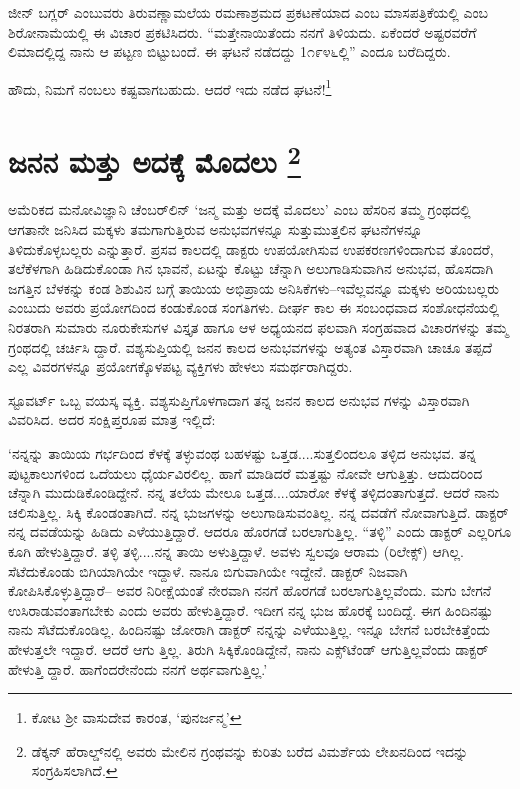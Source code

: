 ಜೀನ್ ಬಗ್ಲರ್ ಎಂಬುವರು ತಿರುವಣ್ಣಾಮಲೆಯ ರಮಣಾಶ್ರಮದ ಪ್ರಕಟಣೆಯಾದ ಎಂಬ ಮಾಸಪತ್ರಿಕೆಯಲ್ಲಿ  ಎಂಬ ಶಿರೋನಾಮೆಯಲ್ಲಿ ಈ ವಿಚಾರ ಪ್ರಕಟಿಸಿದರು. “ಮತ್ತೇನಾಯಿತೆಂದು ನನಗೆ ತಿಳಿಯದು. ಏಕೆಂದರೆ ಅಷ್ಟರವರೆಗೆ ಲಿಮಾದಲ್ಲಿದ್ದ ನಾನು ಆ ಪಟ್ಟಣ ಬಿಟ್ಟುಬಂದೆ. ಈ ಘಟನೆ ನಡೆದದ್ದು 1೧೯೪೬ಲ್ಲಿ” ಎಂದೂ ಬರೆದಿದ್ದರು.

ಹೌದು, ನಿಮಗೆ ನಂಬಲು ಕಷ್ಟವಾಗಬಹುದು. ಆದರೆ ಇದು ನಡೆದ ಘಟನೆ!\footnote{ ಕೋಟ ಶ‍್ರೀ ವಾಸುದೇವ ಕಾರಂತ, ‘ಪುನರ್ಜನ್ಮ’}


\section{ಜನನ ಮತ್ತು ಅದಕ್ಕೆ ಮೊದಲು \protect\footnote{ ಡೆಕ್ಕನ್ ಹೆರಾಲ್ಡ್​ನಲ್ಲಿ  ಅವರು ಮೇಲಿನ ಗ್ರಂಥವನ್ನು ಕುರಿತು ಬರೆದ ವಿಮರ್ಶೆಯ ಲೇಖನದಿಂದ ಇದನ್ನು ಸಂಗ್ರಹಿಸಲಾಗಿದೆ.}}

ಅಮೆರಿಕದ ಮನೋವಿಜ್ಞಾನಿ ಚೆಂಬರ್​ಲಿನ್ ‘ಜನ್ಮ ಮತ್ತು ಅದಕ್ಕೆ ಮೊದಲು’ ಎಂಬ ಹೆಸರಿನ ತಮ್ಮ ಗ್ರಂಥದಲ್ಲಿ ಆಗತಾನೇ ಜನಿಸಿದ ಮಕ್ಕಳು ತಮಗಾಗುತ್ತಿರುವ ಅನುಭವಗಳನ್ನೂ ಸುತ್ತುಮುತ್ತಲಿನ ಘಟನೆಗಳನ್ನೂ ತಿಳಿದುಕೊಳ್ಳಬಲ್ಲರು ಎನ್ನುತ್ತಾರೆ. ಪ್ರಸವ ಕಾಲದಲ್ಲಿ ಡಾಕ್ಟರು ಉಪಯೋಗಿಸುವ ಉಪಕರಣಗಳಿಂದಾಗುವ ತೊಂದರೆ, ತಲೆಕೆಳಗಾಗಿ ಹಿಡಿದುಕೊಂಡಾ ಗಿನ ಭಾವನೆ, ಏಟನ್ನು ಕೊಟ್ಟು ಚೆನ್ನಾಗಿ ಅಲುಗಾಡಿಸುವಾಗಿನ ಅನುಭವ, ಹೊಸದಾಗಿ ಜಗತ್ತಿನ ಬೆಳಕನ್ನು ಕಂಡ ಶಿಶುವಿನ ಬಗ್ಗೆ ತಾಯಿಯ ಅಭಿಪ್ರಾಯ ಅನಿಸಿಕೆಗಳು–ಇವೆಲ್ಲವನ್ನೂ ಮಕ್ಕಳು ಅರಿಯಬಲ್ಲರು ಎಂಬುದು ಅವರು ಪ್ರಯೋಗದಿಂದ ಕಂಡುಕೊಂಡ ಸಂಗತಿಗಳು. ದೀರ್ಘ ಕಾಲ ಈ ಸಂಬಂಧವಾದ ಸಂಶೋಧನೆಯಲ್ಲಿ ನಿರತರಾಗಿ ಸುಮಾರು ನೂರುಕೇಸುಗಳ ವಿಸ್ತೃತ ಹಾಗೂ ಆಳ ಅಧ್ಯಯನದ ಫಲವಾಗಿ ಸಂಗ್ರಹವಾದ ವಿಚಾರಗಳನ್ನು ತಮ್ಮ ಗ್ರಂಥದಲ್ಲಿ ಚರ್ಚಿಸಿ ದ್ದಾರೆ. ವಶ್ಯಸುಪ್ತಿಯಲ್ಲಿ ಜನನ ಕಾಲದ ಅನುಭವಗಳನ್ನು ಅತ್ಯಂತ ವಿಸ್ತಾರವಾಗಿ ಚಾಚೂ ತಪ್ಪದೆ ಎಲ್ಲ ವಿವರಗಳನ್ನೂ ಪ್ರಯೋಗಕ್ಕೊಳಪಟ್ಟ ವ್ಯಕ್ತಿಗಳು ಹೇಳಲು ಸಮರ್ಥರಾಗಿದ್ದರು.

ಸ್ಟೂವರ್ಟ್ ಒಬ್ಬ ವಯಸ್ಕ ವ್ಯಕ್ತಿ. ವಶ್ಯಸುಪ್ತಿಗೊಳಗಾದಾಗ ತನ್ನ ಜನನ ಕಾಲದ ಅನುಭವ ಗಳನ್ನು ವಿಸ್ತಾರವಾಗಿ ವಿವರಿಸಿದ. ಅದರ ಸಂಕ್ಷಿಪ್ತರೂಪ ಮಾತ್ರ ಇಲ್ಲಿದೆ:

‘ನನ್ನನ್ನು ತಾಯಿಯ ಗರ್ಭದಿಂದ ಕೆಳಕ್ಕೆ ತಳ್ಳುವಂಥ ಬಹಳಷ್ಟು ಒತ್ತಡ....ಸುತ್ತಲಿಂದಲೂ ತಳ್ಳಿದ ಅನುಭವ. ತನ್ನ ಪುಟ್ಟಕಾಲುಗಳಿಂದ ಒದೆಯಲು ಧೈರ್ಯವಿರಲಿಲ್ಲ. ಹಾಗೆ ಮಾಡಿದರೆ ಮತ್ತಷ್ಟು ನೋವೇ ಆಗುತ್ತಿತ್ತು. ಆದುದರಿಂದ ಚೆನ್ನಾಗಿ ಮುದುಡಿಕೊಂಡಿದ್ದೇನೆ. ನನ್ನ ತಲೆಯ ಮೇಲೂ ಒತ್ತಡ....ಯಾರೋ ಕೆಳಕ್ಕೆ ತಳ್ಳಿದಂತಾಗುತ್ತದೆ. ಆದರೆ ನಾನು ಚಲಿಸುತ್ತಿಲ್ಲ. ಸಿಕ್ಕಿ ಕೊಂಡಂತಾಗಿದೆ. ನನ್ನ ಭುಜಗಳನ್ನು ಅಲುಗಾಡಿಸುವಂತಿಲ್ಲ. ನನ್ನ ದವಡೆಗೆ ನೋವಾಗುತ್ತಿದೆ. ಡಾಕ್ಟರ್ ನನ್ನ ದವಡೆಯನ್ನು ಹಿಡಿದು ಎಳೆಯುತ್ತಿದ್ದಾರೆ. ಆದರೂ ಹೊರಗಡೆ ಬರಲಾಗುತ್ತಿಲ್ಲ. “ತಳ್ಳಿ” ಎಂದು ಡಾಕ್ಟರ್ ಎಲ್ಲರಿಗೂ ಕೂಗಿ ಹೇಳುತ್ತಿದ್ದಾರೆ. ತಳ್ಳಿ ತಳ್ಳಿ....ನನ್ನ ತಾಯಿ ಅಳುತ್ತಿದ್ದಾಳೆ. ಅವಳು ಸ್ವಲವೂ ಆರಾಮ (ರಿಲೇಕ್ಸ್​) ಆಗಿಲ್ಲ. ಸೆಟೆದುಕೊಂಡು ಬಿಗಿಯಾಗಿಯೇ ಇದ್ದಾಳೆ. ನಾನೂ ಬಿಗುವಾಗಿಯೇ ಇದ್ದೇನೆ. ಡಾಕ್ಟರ್ ನಿಜವಾಗಿ ಕೋಪಿಸಿಕೊಳ್ಳುತ್ತಿದ್ದಾರೆ– ಅವರ ನಿರೀಕ್ಷೆಯಂತೆ ನೇರವಾಗಿ ನನಗೆ ಹೊರಗಡೆ ಬರಲಾಗುತ್ತಿಲ್ಲವೆಂದು. ಮಗು ಬೇಗನೆ ಉಸಿರಾಡುವಂತಾಗಬೇಕು ಎಂದು ಅವರು ಹೇಳುತ್ತಿದ್ದಾರೆ. ಇದೀಗ ನನ್ನ ಭುಜ ಹೊರಕ್ಕೆ ಬಂದಿದ್ದೆ. ಈಗ ಹಿಂದಿನಷ್ಟು ನಾನು ಸೆಟೆದುಕೊಂಡಿಲ್ಲ. ಹಿಂದಿನಷ್ಟು ಜೋರಾಗಿ ಡಾಕ್ಟರ್ ನನ್ನನ್ನು ಎಳೆಯುತ್ತಿಲ್ಲ. ಇನ್ನೂ ಬೇಗನೆ ಬರಬೇಕಿತ್ತೆಂದು ಹೇಳುತ್ತಲೇ ಇದ್ದಾರೆ. ಆದರೆ ಆಗು ತ್ತಿಲ್ಲ. ತಿರುಗಿ ಸಿಕ್ಕಿಕೊಂಡಿದ್ದೇನೆ, ನಾನು ಎಕ್ಸ್​ಟೆಂಡ್ ಆಗುತ್ತಿಲ್ಲವೆಂದು ಡಾಕ್ಟರ್ ಹೇಳುತ್ತಿ ದ್ದಾರೆ. ಹಾಗೆಂದರೇನೆಂದು ನನಗೆ ಅರ್ಥವಾಗುತ್ತಿಲ್ಲ.’

